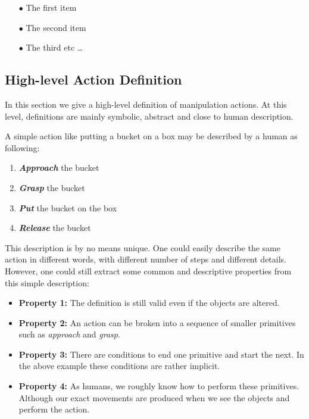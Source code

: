 \begin{itemize}
  \item[$\bullet$] The first item
  \item[$\bullet$] The second item
  \item[$\bullet$] The third etc \ldots
\end{itemize}


\subsection{High-level Action Definition}
\label{sec:high-level}

In this section we give a high-level definition of manipulation actions.
At this level, definitions are mainly symbolic, abstract and close to human description.

A simple action like putting a bucket on a box may be described by a human as following:
\begin{enumerate}
  \item \textbf{\textit{Approach}} the bucket
  \item \textbf{\textit{Grasp}} the bucket
  \item \textbf{\textit{Put}} the bucket on the box
  \item \textbf{\textit{Release}} the bucket
\end{enumerate}
This description is by no means unique.
One could easily describe the same action in different words, with different number of steps and different details.
However, one could still extract some common and descriptive properties from this simple description:
\begin{itemize}
  \item \textbf{Property 1:} The definition is still valid even if the objects are altered.
  \item \textbf{Property 2:} An action can be broken into a sequence of smaller primitives such as \textit{approach} and \textit{grasp}.
  \item \textbf{Property 3:} There are conditions to end one primitive and start the next. In the above example these conditions are rather implicit.
  \item \textbf{Property 4:} As humans, we roughly know how to perform these primitives.
  Although our exact movements are produced when we see the objects and perform the action.
\end{itemize}


